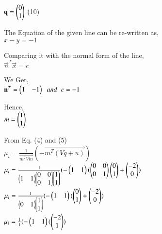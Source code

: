 \documentclass[journal,12pt,twocolumn]{IEEEtran}
\begin{document}
\centering
$ \mathbf{q} = \begin{pmatrix}0\\1\end{pmatrix}$ \hspace{1cm} (10)\\
\vspace{0.25cm}
\raggedright
The Equation of the given line can be re-written as,\\
\vspace{0.25cm}
\centering
$ x - y = -1 $\\
\vspace{0.25cm}
\raggedright
Comparing it with the normal form of the line,\\
\vspace{0.25cm}
\centering
$ \vec{n}^T \vec{x} = c $ \\
\vspace{0.25cm}
\raggedright
We Get,\\
\vspace{0.25cm}
\centering
$ \mathbf{n}^T = \begin{pmatrix}1&-1\end{pmatrix} \hspace{0.2cm} and \hspace{0.2cm} c = -1$\\
\vspace{0.25cm}
\raggedright
Hence,\\
\vspace{0.25cm}
\centering
$ m = \begin{pmatrix}1 \\ 1\end{pmatrix} $ \\
\vspace{0.25cm}
\raggedright
From Eq. (4) and (5)\\
\vspace{0.25cm}
\centering
$ \mu_i = \frac{1}{\vec{m^T Vm}} ( - \vec{m^T (Vq + u)})$\\
\vspace{0.25cm}
$ \mu_i = \frac{1}{\begin{pmatrix}1 & 1\end{pmatrix} \begin{pmatrix}0&0\\0&1\end{pmatrix} \begin{pmatrix}1\\1\end{pmatrix}} ( - \begin{pmatrix}1&1\end{pmatrix} ( \begin{pmatrix}0&0\\0&1\end{pmatrix} \begin{pmatrix}0\\1\end{pmatrix} + \begin{pmatrix}-2\\0\end{pmatrix})$\\ 
\vspace{0.25cm}
$ \mu_i = \frac{1}{\begin{pmatrix}0 & 1\end{pmatrix} \begin{pmatrix}1\\1\end{pmatrix}} ( - \begin{pmatrix}1&1\end{pmatrix} ( \begin{pmatrix}0\\1\end{pmatrix} + \begin{pmatrix}-2\\0\end{pmatrix})$\\ 
\vspace{0.25cm}
$ \mu_i = \frac{1}{1} ( - \begin{pmatrix}1&1\end{pmatrix} ( \begin{pmatrix}-2\\1\end{pmatrix} )$\\ 
\end{document}
